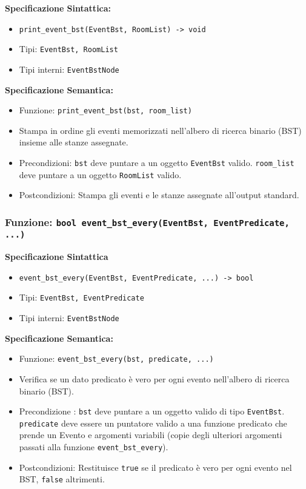\documentclass[11pt]{scrartcl} %
\begin{document}
\textbf{Specificazione Sintattica:}
\begin{itemize}
\item \texttt{print\_event\_bst(EventBst, RoomList) -> void}
\item Tipi: \texttt{EventBst, RoomList}
\item Tipi interni: \texttt{EventBstNode}
\end{itemize}

\textbf{Specificazione Semantica:}
\begin{itemize}
\item Funzione: \texttt{print\_event\_bst(bst, room\_list)}
\item Stampa in ordine gli eventi memorizzati nell'albero di ricerca binario (BST) insieme alle stanze assegnate.
\item Precondizioni: \texttt{bst} deve puntare a un oggetto \texttt{EventBst} valido. \texttt{room\_list} deve puntare a un oggetto \texttt{RoomList} valido.
\item Postcondizioni: Stampa gli eventi e le stanze assegnate all'output standard.
\end{itemize}

\subsubsection{Funzione: \texttt{bool event\_bst\_every(EventBst, EventPredicate, ...)}}

\textbf{Specificazione Sintattica}
\begin{itemize}
\item \texttt{event\_bst\_every(EventBst, EventPredicate, ...) -> bool}
\item Tipi: \texttt{EventBst, EventPredicate}
\item Tipi interni: \texttt{EventBstNode}
\end{itemize}

\textbf{Specificazione Semantica:}
\begin{itemize}
\item Funzione: \texttt{event\_bst\_every(bst, predicate, ...)}
\item Verifica se un dato predicato è vero per ogni evento nell'albero di ricerca binario (BST).
\item Precondizione : \texttt{bst} deve puntare a un oggetto valido di tipo \texttt{EventBst}.
\texttt{predicate} deve essere un puntatore valido a una funzione predicato che prende un Evento e argomenti variabili (copie degli ulteriori argomenti passati alla funzione \texttt{event\_bst\_every}).
\item Postcondizioni: Restituisce \texttt{true} se il predicato è vero per ogni evento nel BST, \texttt{false} altrimenti.
\end{itemize}
\end{document}
